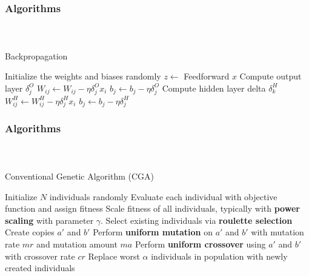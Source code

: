 
\begin{frame}[t]
	\frametitle{Algorithms}
	\framesubtitle{~~}  %

\begin{algorithm}[H]
	\small
\caption{Backpropagation}
\label{alg:backprop}
\begin{algorithmic}
\STATE Initialize the weights and biases randomly
    \STATE $z\gets$ Feedforward $x$
    \STATE Compute output layer $\delta_j^O$
    \STATE ${W_{ij} \leftarrow W_{ij} - \eta \delta^O_j x_i}$
    \STATE $b_j \leftarrow b_j - \eta\delta^O_j$
      \STATE Compute hidden layer delta $\delta_k^H$
      \STATE ${W^H_{ij} \leftarrow W^H_{ij} - \eta\delta^H_jx_i}$
      \STATE $b_j \leftarrow b_j - \eta\delta^H_j$
    \ENDFOR
  \ENDFOR
\ENDFOR
\end{algorithmic}
\end{algorithm}

\end{frame}
\begin{frame}[t]
	\frametitle{Algorithms}
	\framesubtitle{~~}  %

\begin{algorithm}[H]
\small
\caption{Conventional Genetic Algorithm (CGA)}
\label{alg:genetic}
\begin{algorithmic}
\STATE Initialize $N$ individuals randomly
  \STATE Evaluate each individual with objective function and assign fitness
  \STATE Scale fitness of all individuals, typically with \textbf{power scaling} with parameter $\gamma$.
  \STATE Select existing individuals via \textbf{roulette selection}
    \STATE Create copies $a'$ and $b'$
    \STATE Perform \textbf{uniform mutation} on $a'$ and $b'$ with mutation rate $mr$ and mutation amount $ma$
    \STATE Perform \textbf{uniform crossover} using $a'$ and $b'$ with crossover rate $cr$
  \ENDFOR
  \STATE Replace worst $\alpha$ individuals in population with newly created individuals
\ENDFOR
\end{algorithmic}
\end{algorithm}

\end{frame}


